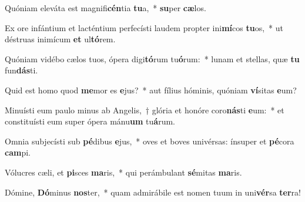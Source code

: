 \item Quóniam eleváta est magnifi\textbf{cén}tia \textbf{tu}a,~* \textbf{su}per \textbf{cæ}los.
\item Ex ore infántium et lacténtium perfecísti laudem propter ini\textbf{mí}cos \textbf{tu}os,~* ut déstruas inimícum \textbf{et} ul\textbf{tó}rem.
\item Quóniam vidébo cælos tuos, ópera digi\textbf{tó}rum tu\textbf{ó}rum:~* lunam et stellas, quæ \textbf{tu} fun\textbf{dás}ti.
\item Quid est homo quod \textbf{me}mor es \textbf{e}jus?~* aut fílius hóminis, quóniam \textbf{ví}sitas \textbf{e}um?
\item Minuísti eum paulo minus ab Angelis,~† glória et honóre coro\textbf{nás}ti \textbf{e}um:~* et constituísti eum super ópera mánu\textbf{um} tu\textbf{á}rum.
\item Omnia subjecísti sub \textbf{pé}dibus \textbf{e}jus,~* oves et boves univérsas: ínsuper et \textbf{pé}cora \textbf{cam}pi.
\item Vólucres cæli, et \textbf{pi}sces \textbf{ma}ris,~* qui perámbulant \textbf{sé}mitas \textbf{ma}ris.
\item Dómine, \textbf{Dó}minus \textbf{nos}ter,~* quam admirábile est nomen tuum in uni\textbf{vér}sa \textbf{ter}ra!
